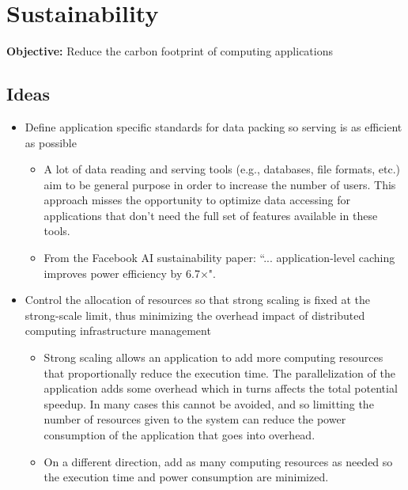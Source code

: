 \documentclass{article}
\begin{document}
    \section*{Sustainability}
    {
        \textbf{Objective:} Reduce the carbon footprint of computing applications

        \subsection*{Ideas}
        {
            \begin{itemize}
                \item Define application specific standards for data packing so serving is as efficient as possible

                    \begin{itemize}
                        \item A lot of data reading and serving tools (e.g., databases, file formats, etc.) aim to be general purpose in order to increase the number of users. This approach misses the opportunity to optimize data accessing for applications that don't need the full set of features available in these tools.
                        \item From the Facebook AI sustainability paper: ``... application-level caching improves power efficiency by 6.7$\times$".
                    \end{itemize}

                \item Control the allocation of resources so that strong scaling is fixed at the strong-scale limit\footnotemark, thus minimizing the overhead impact of distributed computing infrastructure management

                    \begin{itemize}
                        \item Strong scaling allows an application to add more computing resources that proportionally reduce the execution time. The parallelization of the application adds some overhead which in turns affects the total potential speedup. In many cases this cannot be avoided, and so limitting the number of resources given to the system can reduce the power consumption of the application that goes into overhead.
                        \item On a different direction, add as many computing resources as needed so the execution time and power consumption are minimized.
                    \end{itemize}


\end{itemize}}}
\end{document}
